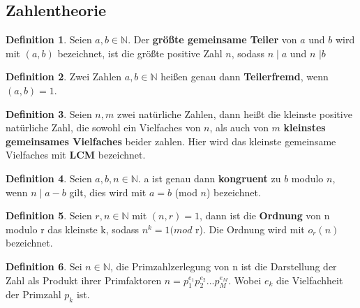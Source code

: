 \documentclass[12pt,oneside]{article}
\theoremstyle{remark}
\theoremstyle{definition}
\newtheorem{definition}{Definition}[section]
\begin{document}
\subsection{Zahlentheorie}
\theoremstyle{definition}
\begin{definition}\label{Df_1}
Seien $a,b \in \mathbb{N}$. Der \textbf{größte gemeinsame Teiler} von $a$ und $b$ wird mit $(a,b)$ bezeichnet, ist die größte positive Zahl $n$, sodass $n \mid a$ und $n$ $ \mid b$
\end{definition}

\smallskip 

\begin{definition}\label{Df_2}
Zwei Zahlen $a,b \in \mathbb{N}$ heißen genau dann \textbf{Teilerfremd}, wenn $(a,b) = 1$.
\end{definition}

\smallskip

\begin{definition}
Seien $n, m$ zwei natürliche Zahlen, dann heißt die kleinste positive natürliche Zahl, die sowohl ein Vielfaches von $n$, als auch von $m$ \textbf{kleinstes gemeinsames Vielfaches} beider zahlen. Hier wird das kleinste gemeinsame Vielfaches mit \textbf{LCM} bezeichnet.
\end{definition}

\smallskip 

\begin{definition}\label{Df_3}
Seien $a, b, n \in \mathbb{N}$. a ist genau dann \textbf{kongruent} zu $b$ modulo $n$, wenn $n \mid a - b $ gilt, dies wird mit $a = b$ (mod $n$) bezeichnet.  
\end{definition}

\smallskip 

\begin{definition}\label{Df_4}
Seien $r,n \in \mathbb{N}$ mit $(n,r) = 1$, dann ist die \textbf{Ordnung} von n modulo r das kleinste k, sodass $n^k = 1 (mod $ r). Die Ordnung wird mit $o_{r}(n)$ bezeichnet.
\end{definition}

\smallskip


\begin{definition}\label{Df_5}
Sei $n \in \mathbb{N}$, die Primzahlzerlegung von n ist die Darstellung der Zahl als Produkt ihrer Primfaktoren \newline
$n = p_{1}^{e_{1}}p_{2}^{e_{2}}...p_{M}^{e_{M}}$. Wobei $e_{k}$ die Vielfachheit der Primzahl $p_{k}$ ist.
\end{definition}
\end{document}
